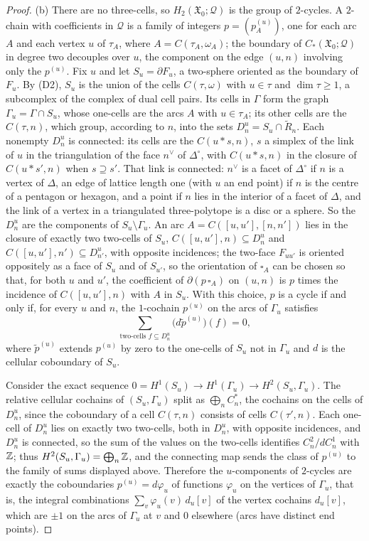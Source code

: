 \begin{proof}
(b) There are no three-cells, so $H_2(\mathfrak X_0;\mathcal Q)$ is the group of $2$-cycles. A $2$-chain with coefficients in $\mathcal Q$ is a
family of integers $p=(p^{(u)}_A)$, one for each arc $A$ and each vertex $u$ of $\tau_A$, where $A=C(\tau_A,\omega_A)$; the
boundary of $C_*(\mathfrak X_0;\mathcal Q)$ in degree two decouples over $u$, the component on the edge $(u,n)$ involving only the
$p^{(u)}$. Fix $u$ and let $S_u=\partial F_u$, a two-sphere oriented as the boundary of $F_u$. By (D2), $S_u$ is the union
of the cells $C(\tau,\omega)$ with $u\in\tau$ and $\dim\tau\ge1$, a subcomplex of the complex of dual cell pairs. Its cells in $\Gamma$
form the graph $\Gamma_u=\Gamma\cap S_u$, whose one-cells are the arcs $A$ with $u\in\tau_A$; its other cells are the
$C(\tau,n)$, which group, according to $n$, into the sets $D^u_n=S_u\cap\widetilde R_n$. Each nonempty $D^u_n$ is connected:
its cells are the $C(u*s,n)$, $s$ a simplex of the link of $u$ in the triangulation of the face $n^\vee$ of
$\Delta^\circ$, with $C(u*s,n)$ in the closure of $C(u*s',n)$ when $s\supseteq s'$. That link is
connected: $n^\vee$ is a facet of $\Delta^\circ$ if $n$ is a vertex of $\Delta$, an edge of lattice length one (with $u$ an end
point) if $n$ is the centre of a pentagon or hexagon, and a point if $n$ lies in the interior of a facet of $\Delta$, and the
link of a vertex in a triangulated three-polytope is a disc or a sphere. So the $D^u_n$ are the components of
$S_u\setminus\Gamma_u$. An arc
$A=C([u,u'],[n,n'])$ lies in the closure of exactly two two-cells of $S_u$, $C([u,u'],n)\subseteq D^u_n$ and
$C([u,u'],n')\subseteq D^u_{n'}$, with opposite incidences; the two-face $F_{uu'}$ is oriented oppositely as a face of
$S_u$ and of $S_{u'}$, so the orientation of $\square_A$ can be chosen so that, for both $u$ and $u'$, the coefficient of
$\partial(p\,\square_A)$ on $(u,n)$ is $p$ times the incidence of $C([u,u'],n)$ with $A$ in $S_u$. With this choice, $p$ is a cycle
if and only if, for every $u$ and $n$, the $1$-cochain $p^{(u)}$ on the arcs of $\Gamma_u$ satisfies
\[
\sum_{\text{two-cells }f\subseteq D^u_n}\bigl(d\tilde p^{(u)}\bigr)(f)=0,
\]
where $\tilde p^{(u)}$ extends $p^{(u)}$ by zero to the one-cells of $S_u$ not in $\Gamma_u$ and $d$ is the cellular
coboundary of $S_u$.

Consider the exact sequence $0=H^1(S_u)\to H^1(\Gamma_u)\to H^2(S_u,\Gamma_u)$. The relative cellular cochains of
$(S_u,\Gamma_u)$ split as $\bigoplus_nC^*_n$, the cochains on the cells of $D^u_n$, since the coboundary of a cell $C(\tau,n)$
consists of cells $C(\tau',n)$. Each one-cell of $D^u_n$ lies on exactly two two-cells, both in $D^u_n$, with opposite
incidences, and $D^u_n$ is connected, so the sum of the values on the two-cells identifies $C^2_n/d C^1_n$ with $\mathbb Z$;
thus $H^2(S_u,\Gamma_u)=\bigoplus_n\mathbb Z$, and the connecting map sends the class of $p^{(u)}$ to the family of sums displayed
above. Therefore the $u$-components of $2$-cycles are exactly the coboundaries $p^{(u)}=d\varphi_u$ of functions
$\varphi_u$ on the vertices of $\Gamma_u$, that is, the integral combinations $\sum_v\varphi_u(v)\,d_u[v]$ of the vertex
cochains $d_u[v]$, which are $\pm1$ on the arcs of $\Gamma_u$ at $v$ and $0$ elsewhere (arcs have distinct end points).


\end{proof}
